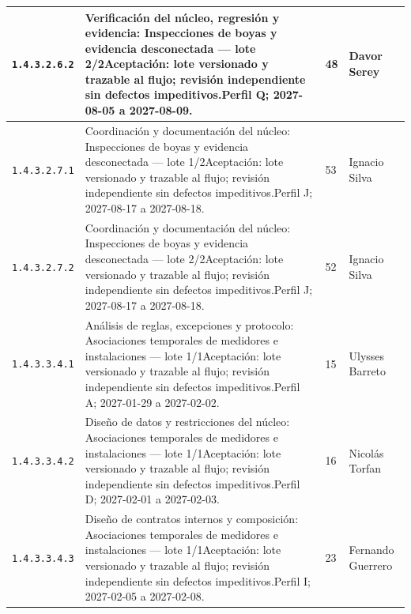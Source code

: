 \begin{longtable}{L{29mm}L{80mm}R{12mm}L{28mm}}
\texttt{1.\allowbreak{}4.\allowbreak{}3.\allowbreak{}2.\allowbreak{}6.\allowbreak{}2} & Verificación del núcleo, regresión y evidencia: Inspecciones de boyas y evidencia desconectada — lote 2/2\newline Aceptación: lote versionado y trazable al flujo; revisión independiente sin defectos impeditivos.\newline Perfil Q; 2027-08-05 a 2027-08-09. & 48 & Davor Serey\\\hline
\texttt{1.\allowbreak{}4.\allowbreak{}3.\allowbreak{}2.\allowbreak{}7.\allowbreak{}1} & Coordinación y documentación del núcleo: Inspecciones de boyas y evidencia desconectada — lote 1/2\newline Aceptación: lote versionado y trazable al flujo; revisión independiente sin defectos impeditivos.\newline Perfil J; 2027-08-17 a 2027-08-18. & 53 & Ignacio Silva\\\hline
\texttt{1.\allowbreak{}4.\allowbreak{}3.\allowbreak{}2.\allowbreak{}7.\allowbreak{}2} & Coordinación y documentación del núcleo: Inspecciones de boyas y evidencia desconectada — lote 2/2\newline Aceptación: lote versionado y trazable al flujo; revisión independiente sin defectos impeditivos.\newline Perfil J; 2027-08-17 a 2027-08-18. & 52 & Ignacio Silva\\\hline
\texttt{1.\allowbreak{}4.\allowbreak{}3.\allowbreak{}3.\allowbreak{}4.\allowbreak{}1} & Análisis de reglas, excepciones y protocolo: Asociaciones temporales de medidores e instalaciones — lote 1/1\newline Aceptación: lote versionado y trazable al flujo; revisión independiente sin defectos impeditivos.\newline Perfil A; 2027-01-29 a 2027-02-02. & 15 & Ulysses Barreto\\\hline
\texttt{1.\allowbreak{}4.\allowbreak{}3.\allowbreak{}3.\allowbreak{}4.\allowbreak{}2} & Diseño de datos y restricciones del núcleo: Asociaciones temporales de medidores e instalaciones — lote 1/1\newline Aceptación: lote versionado y trazable al flujo; revisión independiente sin defectos impeditivos.\newline Perfil D; 2027-02-01 a 2027-02-03. & 16 & Nicolás Torfan\\\hline
\texttt{1.\allowbreak{}4.\allowbreak{}3.\allowbreak{}3.\allowbreak{}4.\allowbreak{}3} & Diseño de contratos internos y composición: Asociaciones temporales de medidores e instalaciones — lote 1/1\newline Aceptación: lote versionado y trazable al flujo; revisión independiente sin defectos impeditivos.\newline Perfil I; 2027-02-05 a 2027-02-08. & 23 & Fernando Guerrero\\\hline

\end{longtable}
